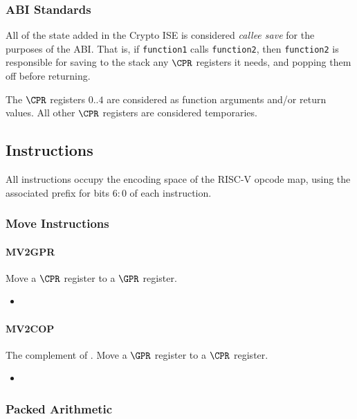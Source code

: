 \subsubsection{ABI Standards}

All of the state added in the Crypto ISE is considered {\em callee save}
for the purposes of the ABI. That is, if {\tt function1} calls 
{\tt function2}, then {\tt function2} is responsible for saving to the
stack any $\CPR$ registers it needs, and popping them off before returning.

The $\CPR$ registers $0..4$ are considered as function arguments
and/or return values. 
All other $\CPR$ registers are considered temporaries.

\subsection{Instructions}

All instructions occupy the \encspace encoding space of the RISC-V opcode
map, using the associated \encopcode prefix for bits $6:0$ of each 
instruction.

\subsubsection{Move Instructions}
\paragraph{MV2GPR}

Move a $\CPR$ register to a $\GPR$ register.

\begin{itemize}
\item {}
\end{itemize}


\paragraph{MV2COP}

The complement of .
Move a $\GPR$ register to a $\CPR$ register.

\begin{itemize}
\item {}
\end{itemize}

\subsubsection{Packed Arithmetic}

